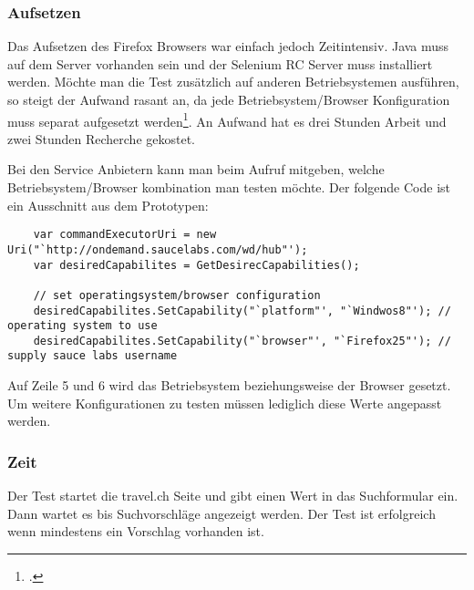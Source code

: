 \subsubsection{Aufsetzen}
Das Aufsetzen des Firefox Browsers war einfach jedoch Zeitintensiv. Java muss auf dem Server vorhanden sein und der Selenium RC Server muss installiert werden. Möchte man die Test zusätzlich auf anderen Betriebsystemen ausführen, so steigt der Aufwand rasant an, da jede Betriebsystem/Browser Konfiguration muss separat aufgesetzt werden\footcite{Selenium_Linux}. An Aufwand hat es drei Stunden Arbeit und zwei Stunden Recherche gekostet.

Bei den Service Anbietern kann man beim Aufruf mitgeben, welche Betriebsystem/Browser kombination man testen möchte. Der folgende Code ist ein Ausschnitt aus dem Prototypen:

\begin{lstlisting}
    var commandExecutorUri = new Uri("`http://ondemand.saucelabs.com/wd/hub"');
    var desiredCapabilites = GetDesirecCapabilities();

    // set operatingsystem/browser configuration
    desiredCapabilites.SetCapability("`platform"', "`Windwos8"'); // operating system to use
    desiredCapabilites.SetCapability("`browser"', "`Firefox25"'); // supply sauce labs username
\end{lstlisting}
Auf Zeile 5 und 6 wird das Betriebsystem beziehungsweise der Browser gesetzt. Um weitere Konfigurationen zu testen müssen lediglich diese Werte angepasst werden.

\subsubsection{Zeit}
Der Test startet die travel.ch Seite und gibt einen Wert in das Suchformular ein. Dann wartet es bis Suchvorschläge angezeigt werden. Der Test ist erfolgreich wenn mindestens ein Vorschlag vorhanden ist.

